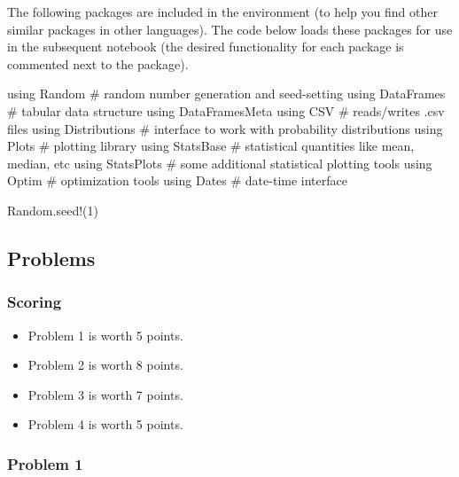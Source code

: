 \documentclass[
  letterpaper,
  DIV=11,
  numbers=noendperiod]{scrartcl}
\newenvironment{Shaded}{\begin{snugshade}}{\end{snugshade}}
\newcommand{\BuiltInTok}[1]{\textcolor[rgb]{0.00,0.23,0.31}{#1}}
\newcommand{\CommentTok}[1]{\textcolor[rgb]{0.37,0.37,0.37}{#1}}
\newcommand{\FloatTok}[1]{\textcolor[rgb]{0.68,0.00,0.00}{#1}}
\newcommand{\FunctionTok}[1]{\textcolor[rgb]{0.28,0.35,0.67}{#1}}
\newcommand{\ImportTok}[1]{\textcolor[rgb]{0.00,0.46,0.62}{#1}}
\newcommand{\NormalTok}[1]{\textcolor[rgb]{0.00,0.23,0.31}{#1}}
\providecommand{\tightlist}{%
  \setlength{\itemsep}{0pt}\setlength{\parskip}{0pt}}
\begin{document}
The following packages are included in the environment (to help you find
other similar packages in other languages). The code below loads these
packages for use in the subsequent notebook (the desired functionality
for each package is commented next to the package).

\begin{Shaded}
\begin{Highlighting}[]
\ImportTok{using} \BuiltInTok{Random} \CommentTok{\# random number generation and seed{-}setting}
\ImportTok{using} \BuiltInTok{DataFrames} \CommentTok{\# tabular data structure}
\ImportTok{using} \BuiltInTok{DataFramesMeta}
\ImportTok{using} \BuiltInTok{CSV} \CommentTok{\# reads/writes .csv files}
\ImportTok{using} \BuiltInTok{Distributions} \CommentTok{\# interface to work with probability distributions}
\ImportTok{using} \BuiltInTok{Plots} \CommentTok{\# plotting library}
\ImportTok{using} \BuiltInTok{StatsBase} \CommentTok{\# statistical quantities like mean, median, etc}
\ImportTok{using} \BuiltInTok{StatsPlots} \CommentTok{\# some additional statistical plotting tools}
\ImportTok{using} \BuiltInTok{Optim} \CommentTok{\# optimization tools}
\ImportTok{using} \BuiltInTok{Dates} \CommentTok{\# date{-}time interface}

\BuiltInTok{Random}\NormalTok{.}\FunctionTok{seed!}\NormalTok{(}\FloatTok{1}\NormalTok{)}
\end{Highlighting}
\end{Shaded}

\subsection{Problems}\label{problems}

\subsubsection{Scoring}\label{scoring}

\begin{itemize}
\tightlist
\item
  Problem 1 is worth 5 points.
\item
  Problem 2 is worth 8 points.
\item
  Problem 3 is worth 7 points.
\item
  Problem 4 is worth 5 points.
\end{itemize}

\subsubsection{Problem 1}\label{problem-1}
\end{document}
